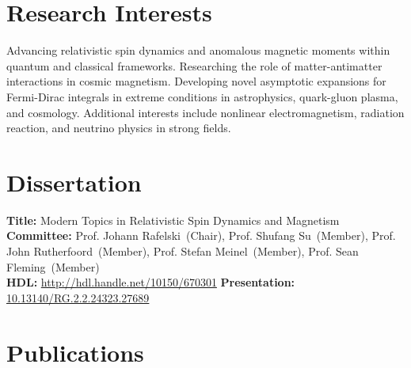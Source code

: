 \documentclass[11pt]{article}
\begin{document}
\section*{Research Interests}
Advancing relativistic spin dynamics and anomalous magnetic moments within quantum and classical frameworks. Researching the role of matter-antimatter interactions in cosmic magnetism. Developing novel asymptotic expansions for Fermi-Dirac integrals in extreme conditions in astrophysics, quark-gluon plasma, and cosmology. Additional interests include nonlinear electromagnetism, radiation reaction, and neutrino physics in strong fields. 

\section*{Dissertation}
\textbf{Title:} Modern Topics in Relativistic Spin Dynamics and Magnetism\\[0.3em]
\textbf{Committee:} Prof. Johann Rafelski~(Chair), Prof. Shufang Su~(Member), Prof. John Rutherfoord~(Member), Prof. Stefan Meinel~(Member), Prof. Sean Fleming~(Member)\\[0.3em]
\textbf{HDL:} \href{http://hdl.handle.net/10150/670301}{http://hdl.handle.net/10150/670301} \textbf{Presentation:} \href{http://dx.doi.org/10.13140/RG.2.2.24323.27689}{10.13140/RG.2.2.24323.27689}\\[0.3em]

\newpage

\section*{Publications}
\end{document}
